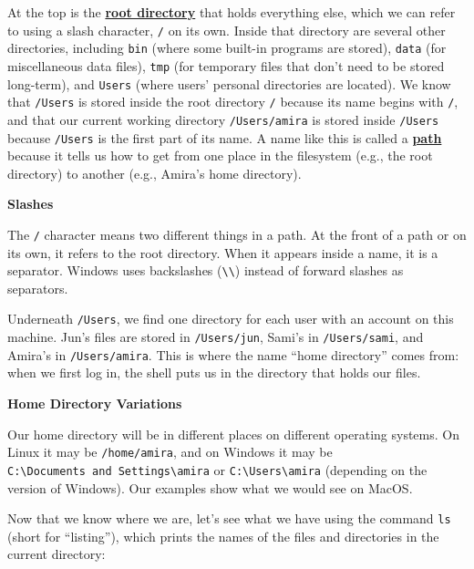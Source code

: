 \documentclass[
]{krantz}
\renewenvironment{quote}{\begin{VF}}{\end{VF}}
\newcommand{\gref}[2]{\hyperlink{#2}{\textbf{#1}}}
\begin{document}
At the top is the \gref{root directory}{root\_directory} that holds everything else,
which we can refer to using a slash character, \texttt{/} on its own.
Inside that directory are several other directories,
including \texttt{bin} (where some built-in programs are stored),
\texttt{data} (for miscellaneous data files),
\texttt{tmp} (for temporary files that don't need to be stored long-term),
and \texttt{Users} (where users' personal directories are located).
We know that \texttt{/Users} is stored inside the root directory \texttt{/} because its name begins with \texttt{/},
and that our current working directory \texttt{/Users/amira} is stored inside \texttt{/Users}
because \texttt{/Users} is the first part of its name.
A name like this is called a \gref{path}{path} because it tells us
how to get from one place in the filesystem (e.g., the root directory)
to another (e.g., Amira's home directory).

\begin{quote}
\textbf{Slashes}

The \texttt{/} character means two different things in a path.
At the front of a path or on its own,
it refers to the root directory.
When it appears inside a name, it is a separator.
Windows uses backslashes (\texttt{\textbackslash{}\textbackslash{}}) instead of forward slashes as separators.
\end{quote}

Underneath \texttt{/Users},
we find one directory for each user with an account on this machine.
Jun's files are stored in \texttt{/Users/jun},
Sami's in \texttt{/Users/sami},
and Amira's in \texttt{/Users/amira}.
This is where the name ``home directory'' comes from:
when we first log in,
the shell puts us in the directory that holds our files.

\begin{quote}
\textbf{Home Directory Variations}

Our home directory will be in different places on different operating systems.
On Linux it may be \texttt{/home/amira},
and on Windows it may be \texttt{C:\textbackslash{}Documents\ and\ Settings\textbackslash{}amira} or \texttt{C:\textbackslash{}Users\textbackslash{}amira}
(depending on the version of Windows).
Our examples show what we would see on MacOS.
\end{quote}

Now that we know where we are,
let's see what we have using the command \texttt{ls}
(short for ``listing''),
which prints the names of the files and directories in the current directory:
\end{document}
